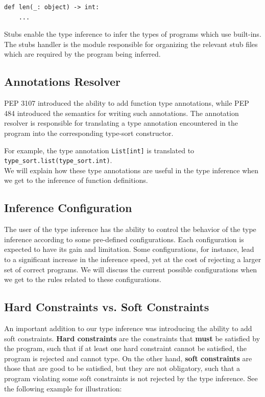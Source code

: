 \begin{lstlisting}
def len(_: object) -> int:
	...
\end{lstlisting}

Stubs enable the type inference to infer the types of programs which use built-ins. The stubs handler is the module responsible for organizing the relevant stub files which are required by the program being inferred.

\subsection{Annotations Resolver}
PEP 3107 \cite{3107} introduced the ability to add function type annotations, while PEP 484 \cite{484} introduced the semantics for writing such annotations. The annotation resolver is responsible for translating a type annotation encountered in the program into the corresponding type-sort constructor.

For example, the type annotation \lstinline|List[int]| is translated to \lstinline|type_sort.list(type_sort.int)|.\\

We will explain how these type annotations are useful in the type inference when we get to the inference of function definitions.
\subsection{Inference Configuration}\label{sub:config}
The user of the type inference has the ability to control the behavior of the type inference according to some pre-defined configurations. Each configuration is expected to have its gain and limitation. Some configurations, for instance, lead to a significant increase in the inference speed, yet at the cost of rejecting a larger set of correct programs. We will discuss the current possible configurations when we get to the rules related to these configurations.
\subsection{Hard Constraints vs. Soft Constraints}
An important addition to our type inference was introducing the ability to add soft constraints. \textbf{Hard constraints} are the constraints that \textbf{must} be satisfied by the program, such that if at least one hard constraint cannot be satisfied, the program is rejected and cannot type. On the other hand, \textbf{soft constraints} are those that are good to be satisfied, but they are not obligatory, such that a program violating some soft constraints is not rejected by the type inference. See the following example for illustration:

